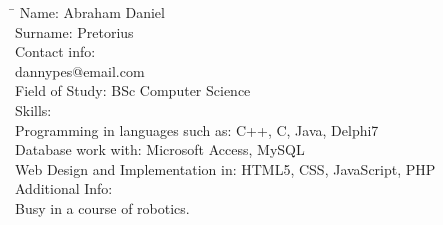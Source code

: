 \documentclass[12pt]{article}
\begin{document}
	\begin{tabbing}
		\hspace*{3.5cm}\=\hspace*{3cm} \kill
		Name: \> Abraham Daniel \\
		Surname: \>  Pretorius \\
		Contact info:  \\
			\> dannypes@email.com	\\	
		Field of Study: \> BSc Computer Science \\
		Skills: \\
			\> Programming in languages such as: C++, C, Java, Delphi7 \\
			\> Database work with: Microsoft Access, MySQL \\
			\> Web Design and Implementation in: HTML5, CSS, JavaScript, PHP \\
		Additional Info: \\
			\> Busy in a course of robotics. \\		
	\end{tabbing}
\end{document}
